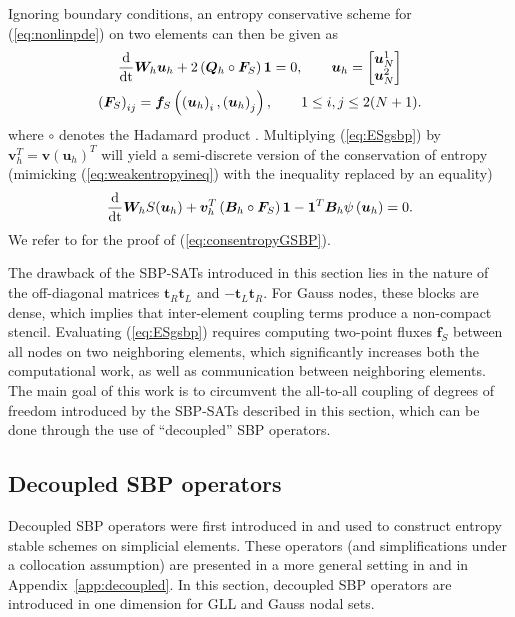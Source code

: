 \documentclass[review,onefignum,onetabnum,final]{siamart171218}
\newcommand{\td}[2]{\frac{{\rm d}#1}{{\rm d}{\rm #2}}}
\newcommand{\LRp}[1]{\left( #1 \right)}
\begin{document}
Ignoring boundary conditions, an entropy conservative scheme for (\ref{eq:nonlinpde}) on two elements can then be given as
\begin{gather}
\td{}{t}\bm{W}_h\bm{u}_h + 2\LRp{\bm{Q}_h \circ \bm{F}_S}\bm{1} = 0, \qquad \bm{u}_h = \begin{bmatrix}
\bm{u}^1_N\\
\bm{u}^2_N
\end{bmatrix} \label{eq:ESgsbp} \\
\LRp{\bm{F}_S}_{ij} = \bm{f}_S\LRp{\LRp{\bm{u}_h}_i,\LRp{\bm{u}_h}_j}, \qquad 1 \leq  i,j \leq 2(N+1). \nonumber
\end{gather}
where $\circ$ denotes the Hadamard product \cite{horn2012matrix}.  Multiplying (\ref{eq:ESgsbp}) by $\bm{v}_h^T = \bm{v}\LRp{\bm{u}_h}^T$ 
will yield a semi-discrete version of the conservation of entropy (mimicking (\ref{eq:weakentropyineq}) with the inequality replaced by an equality)
\begin{equation}
\label{eq:consentropyGSBP}
\td{}{t}\bm{W}_h S(\bm{u}_h) + \bm{v}_h^T\LRp{\bm{B}_h\circ \bm{F}_S}\bm{1} -\bm{1}^T\bm{B}_h\psi\LRp{\bm{u}_h} = 0.
\end{equation}
We refer to \cite{crean2017high,crean2018entropy} for the proof of (\ref{eq:consentropyGSBP}).  

The drawback of the SBP-SATs introduced in this section lies in the nature of the off-diagonal matrices $\bm{t}_R\bm{t}_L$ and $-\bm{t}_L\bm{t}_R$.  For Gauss nodes, these blocks are dense, which implies that inter-element coupling terms produce a non-compact stencil.  Evaluating (\ref{eq:ESgsbp}) requires computing two-point fluxes $\bm{f}_S$ between all nodes on two neighboring elements, which significantly increases both the computational work, as well as communication between neighboring elements.  The main goal of this work is to circumvent the all-to-all coupling of degrees of freedom introduced by the SBP-SATs described in this section, which can be done through the use of ``decoupled'' SBP operators.  

\subsection{Decoupled SBP operators}

Decoupled SBP operators were first introduced in \cite{chan2017discretely} and used to construct entropy stable schemes on simplicial elements.  These operators (and simplifications under a collocation assumption) are presented in a more general setting in \cite{chan2017discretely, chan2018discretely} and in Appendix~\ref{app:decoupled}.  In this section, decoupled SBP operators are introduced in one dimension for GLL and Gauss nodal sets.  
\end{document}
